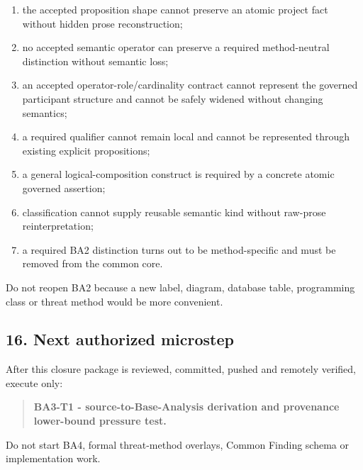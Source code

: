 \documentclass[11pt,a4paper]{article}
\providecommand{\tightlist}{\setlength{\itemsep}{0pt}\setlength{\parskip}{0pt}}
\begin{document}
\begin{enumerate}
\def\labelenumi{\arabic{enumi}.}
\tightlist
\item
  the accepted proposition shape cannot preserve an atomic project fact without hidden prose reconstruction;
\item
  no accepted semantic operator can preserve a required method-neutral distinction without semantic loss;
\item
  an accepted operator-role/cardinality contract cannot represent the governed participant structure and cannot be safely widened without changing semantics;
\item
  a required qualifier cannot remain local and cannot be represented through existing explicit propositions;
\item
  a general logical-composition construct is required by a concrete atomic governed assertion;
\item
  classification cannot supply reusable semantic kind without raw-prose reinterpretation;
\item
  a required BA2 distinction turns out to be method-specific and must be removed from the common core.
\end{enumerate}

Do not reopen BA2 because a new label, diagram, database table, programming class or threat method would be more convenient.

\subsection{16. Next authorized microstep}\label{next-authorized-microstep}

After this closure package is reviewed, committed, pushed and remotely verified, execute only:

\begin{quote}
\textbf{BA3-T1 - source-to-Base-Analysis derivation and provenance lower-bound pressure test.}
\end{quote}

Do not start BA4, formal threat-method overlays, Common Finding schema or implementation work.
\end{document}
